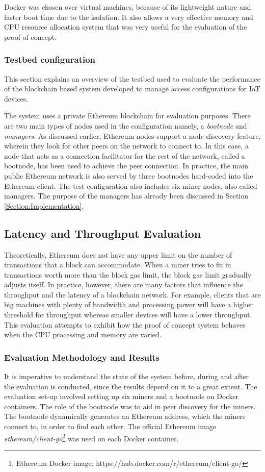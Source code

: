 \documentclass[english]{tktltiki}
\begin{document}
Docker was chosen over virtual machines, because of its lightweight nature and faster boot time due to the isolation. It also allows a very effective memory and CPU resource allocation system that was very useful for the evaluation of the proof of concept. 

\subsubsection{Testbed configuration}
This section explains an overview of the testbed used to evaluate the performance of the blockchain based system developed to manage access configurations for IoT devices. 

The system uses a private Ethereum blockchain for evaluation purposes. There are two main types of nodes used in the configuration namely, a \textit{bootnode} and \textit{managers}. As discussed earlier, Ethereum nodes support a node discovery feature, wherein they look for other peers on the network to connect to. In this case, a node that acts as a connection facilitator for the rest of the network, called a bootnode, has been used to achieve the peer connection. In practice, the main public Ethereum network is also served by three bootnodes hard-coded into the Ethereum client. The test configuration also includes six miner nodes, also called managers. The purpose of the managers has already been discussed in Section \ref{Section:Implementation}.

\subsection{Latency and Throughput Evaluation} \label{Section: Latency}
Theoretically, Ethereum does not have any upper limit on the number of transactions that a block can accommodate. When a miner tries to fit in transactions worth more than the block gas limit, the block gas limit gradually adjusts itself. In practice, however, there are many factors that influence the throughput and the latency of a blockchain network. For example, clients that are big machines with plenty of bandwidth and processing power will have a higher threshold for throughput whereas smaller devices will have a lower throughput. This evaluation attempts to exhibit how the proof of concept system behaves when the CPU processing and memory are varied. 

\subsubsection*{Evaluation Methodology and Results}
It is imperative to understand the state of the system before, during and after the evaluation is conducted, since the results depend on it to a great extent. The evaluation set-up involved setting up six miners and a bootnode on Docker containers. The role of the bootnode was to aid in peer discovery for the miners. The bootnode dynamically generates an Ethereum address, which the miners connect to, in order to find each other. The official Ethereum image \textit{ethereum/client-go\footnote{Ethereum Docker image: https://hub.docker.com/r/ethereum/client-go/}} was used on each Docker container. 
\end{document}
